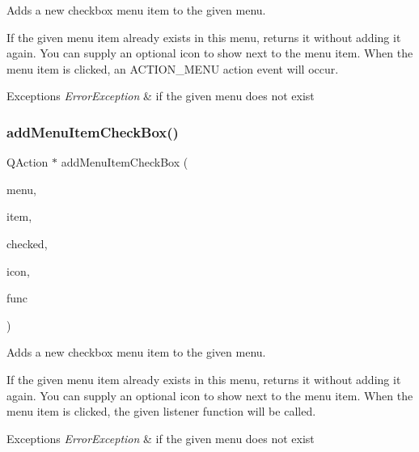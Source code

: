 Adds a new checkbox menu item to the given menu. 

If the given menu item already exists in this menu, returns it without adding it again. You can supply an optional icon to show next to the menu item. When the menu item is clicked, an A\+C\+T\+I\+O\+N\+\_\+\+M\+E\+NU action event will occur. 
\begin{DoxyExceptions}{Exceptions}
{\em Error\+Exception} & if the given menu does not exist \\
\hline
\end{DoxyExceptions}
\mbox{\label{classsgl_1_1GWindow_aab18d66dc7ed71468da3611b28450995}} 
\subsubsection{\texorpdfstring{add\+Menu\+Item\+Check\+Box()}{addMenuItemCheckBox()}\hspace{0.1cm}{\footnotesize\ttfamily [2/2]}}
{\footnotesize\ttfamily Q\+Action $\ast$ add\+Menu\+Item\+Check\+Box (\begin{DoxyParamCaption}\item[{const std\+::string \&}]{menu,  }\item[{const std\+::string \&}]{item,  }\item[{bool}]{checked,  }\item[{const std\+::string \&}]{icon,  }\item[{\mbox{\hyperlink{namespacesgl_a54427ce97bb1c2804e4fe2b0a62e8b17}{G\+Event\+Listener\+Void}}}]{func }\end{DoxyParamCaption})\hspace{0.3cm}{\ttfamily [virtual]}}



Adds a new checkbox menu item to the given menu. 

If the given menu item already exists in this menu, returns it without adding it again. You can supply an optional icon to show next to the menu item. When the menu item is clicked, the given listener function will be called. 
\begin{DoxyExceptions}{Exceptions}
{\em Error\+Exception} & if the given menu does not exist \\
\hline
\end{DoxyExceptions}
\mbox{\label{classsgl_1_1GWindow_abdf4f167a7135e31ecb8f3363fddfd19}} 

